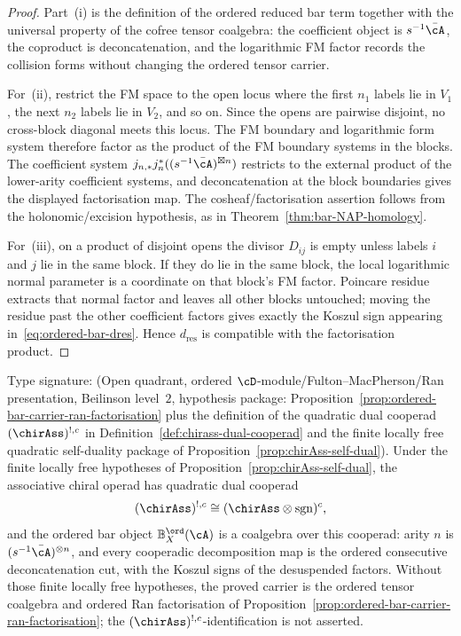 \begin{proof}
Part~\textup{(i)} is the definition of the ordered reduced bar term
together with the universal property of the cofree tensor coalgebra:
the coefficient object is \(s^{-1}\bar\cA\), the coproduct is
deconcatenation, and the logarithmic FM factor records the collision
forms without changing the ordered tensor carrier.

For~\textup{(ii)}, restrict the FM space to the open locus where the
first $n_1$ labels lie in $V_1$, the next $n_2$ labels lie in $V_2$,
and so on. Since the opens are pairwise disjoint, no cross-block
diagonal meets this locus. The FM boundary and logarithmic form system
therefore factor as the product of the FM boundary systems in the
blocks. The coefficient system
$j_{n,*}j_n^*((s^{-1}\bar\cA)^{\boxtimes n})$ restricts to the
external product of the lower-arity coefficient systems, and
deconcatenation at the block boundaries gives the displayed
factorisation map. The cosheaf/factorisation assertion follows from
the holonomic/excision hypothesis, as in
Theorem~\ref{thm:bar-NAP-homology}.

For~\textup{(iii)}, on a product of disjoint opens the divisor
$D_{ij}$ is empty unless labels $i$ and $j$ lie in the same block. If
they do lie in the same block, the local logarithmic normal parameter
is a coordinate on that block's FM factor. Poincare residue extracts
that normal factor and leaves all other blocks untouched; moving the
residue past the other coefficient factors gives exactly the Koszul
sign appearing in~\eqref{eq:ordered-bar-dres}. Hence
$d_{\mathrm{res}}$ is compatible with the factorisation product.
\end{proof}

\begin{corollary}
\label{cor:ordered-bar-chirass-dual-carrier}
Type signature: \textup{(}Open quadrant, ordered
$\cD$-module/Fulton--MacPherson/Ran presentation, Beilinson level~$2$,
hypothesis package:
Proposition~\ref{prop:ordered-bar-carrier-ran-factorisation} plus the
definition of the quadratic dual cooperad
\((\chirAss)^{!,c}\) in
Definition~\ref{def:chirass-dual-cooperad} and the
finite locally free quadratic self-duality package of
Proposition~\ref{prop:chirAss-self-dual}\textup{)}.
Under the finite locally free hypotheses of
Proposition~\ref{prop:chirAss-self-dual}, the associative chiral
operad has quadratic dual cooperad
\[
(\chirAss)^{!,c}\cong(\chirAss\otimes\operatorname{sgn})^c,
\]
and the ordered bar object \(\mathbb B_X^{\ord}(\cA)\) is a coalgebra
over this cooperad: arity \(n\) is
\((s^{-1}\bar\cA)^{\otimes n}\), and every cooperadic decomposition
map is the ordered consecutive deconcatenation cut, with the Koszul
signs of the desuspended factors. Without those finite locally free
hypotheses, the
proved carrier is the ordered tensor coalgebra and ordered Ran
factorisation of
Proposition~\ref{prop:ordered-bar-carrier-ran-factorisation}; the
\((\chirAss)^{!,c}\)-identification is not asserted.
\end{corollary}

